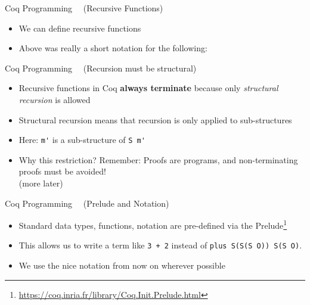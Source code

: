 \begin{frame}[fragile]{Coq Programming\small~~ (Recursive Functions)}
\begin{itemize}
  \item We can define recursive functions
  

  \pause

  \item Above was really a short notation for the following:
  
\end{itemize}
\end{frame}

\begin{frame}[fragile]{Coq Programming\small~~ (Recursion must be structural)}

\begin{itemize}
  \item Recursive functions in Coq \textbf{always terminate} because only \textit{structural recursion} is allowed

  \pause

  \item Structural recursion means that recursion is only applied to sub-structures
  \item Here: \lstinline|m'| is a sub-structure of \lstinline|S m'|

  \pause

  \item Why this restriction? Remember: Proofs are programs, and non-terminating proofs must be avoided!\\
  (more later)
\end{itemize}
\end{frame}

\begin{frame}{Coq Programming\small~~ (Prelude and Notation)}
\begin{itemize}
  \item Standard data types, functions, notation are pre-defined via the Prelude\footnote{\scriptsize\url{https://coq.inria.fr/library/Coq.Init.Prelude.html}}
  \item This allows us to write a term like \lstinline|3 + 2| instead of \lstinline|plus S(S(S O)) S(S O)|.
  \item We use the nice notation from now on wherever possible
\end{itemize}
\end{frame}

